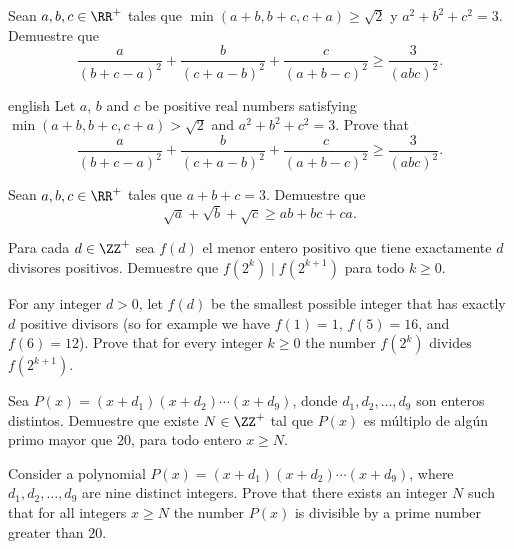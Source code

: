 \begin{probHR}[ISL 2011/A7]
	Sean $a,b,c\in\RR^+$ tales que $\min(a+b,b+c,c+a)\ge\sqrt2$ y $a^2+b^2+c^2=3$. Demuestre que
	\[\frac{a}{(b+c-a)^2}+\frac{b}{(c+a-b)^2}+\frac{c}{(a+b-c)^2}\ge\frac{3}{(abc)^2}.\]
	\begin{hint}
		\begin{otherlanguage*}{english}
			Let $a$, $b$ and $c$ be positive real numbers satisfying $\min(a+b,b+c,c+a)>\sqrt2$ and $a^2+b^2+c^2=3$. Prove that
			\[\frac{a}{(b+c-a)^2}+\frac{b}{(c+a-b)^2}+\frac{c}{(a+b-c)^2}\ge\frac{3}{(abc)^2}.\]
		\end{otherlanguage*}
	\end{hint}
\end{probHR}

\begin{probEG}
	Sean $a,b,c\in\RR^+$ tales que $a+b+c=3$. Demuestre que
	\[\sqrt{a}+\sqrt{b}+\sqrt{c}\ge ab+bc+ca.\]
\end{probEG}


\begin{probEG}[ISL 2011/N1]
	Para cada $d\in\ZZ^+$ sea $f(d)$ el menor entero positivo que tiene exactamente $d$ divisores positivos. Demuestre que $f(2^k)\mid f(2^{k+1})$ para todo $k\ge 0$.
	\forum[aops]{2737648}
	\begin{hint}
		For any integer $d>0$, let $f(d)$ be the smallest possible integer that has exactly $d$ positive divisors (so for example we have $f(1)=1$, $f(5)=16$, and $f(6)=12$). Prove that for every integer $k\ge 0$ the number $f(2^k)$ divides $f(2^{k+1})$.
	\end{hint}
\end{probEG}

\begin{probMG}[ISL 2011/N2]
	Sea $P(x)=(x+d_1)(x+d_2)\cdots(x+d_9)$, donde $d_1,d_2,\dots,d_9$ son enteros distintos. Demuestre que existe $N\in\ZZ^+$ tal que $P(x)$ es múltiplo de algún primo mayor que $20$, para todo entero $x\ge N$.
	\forum[aops]{2737650}
	\begin{hint}
		Consider a polynomial $P(x)=(x+d_1)(x+d_2)\cdots(x+d_9)$, where $d_1,d_2,\dots,d_9$ are nine distinct integers. Prove that there exists an integer $N$ such that for all integers $x\ge N$ the number $P(x)$ is divisible by a prime number greater than $20$.
	\end{hint}
\end{probMG}


